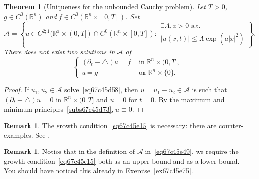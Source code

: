 \documentclass[a4paper,9pt]{amsart}
\newcommand{\scr}[1]{\mathscr{#1}}
\newcommand{\R}{\mathbb{R}}	%
\newcommand{\de}{\partial}		%
\newcommand{\laplacian}{\triangle}
\theoremstyle{plain}
\newtheorem{theorem}[proposition]{Theorem}
\theoremstyle{definition}
\newtheorem{remark}[proposition]{Remark}
\theoremstyle{remark}
\begin{document}
\begin{theorem}[Uniqueness for the unbounded Cauchy problem]\label{thm67c45cb9}
	Let $T>0$, $g\in C^0(\R^n)$ and $f\in C^0(\R^n\times[0,T])$.
	Set 
	\begin{equation}\label{eq67c45e49}
		\scr A = \left\{
		u\in C^{2;1}(\R^n\times(0,T])\cap C^0(\R^n\times[0,T]) : 
		\begin{array}{c}
		\exists A,a>0 \text{ s.t.}\\
		|u(x,t)| \le A\exp(a|x|^2)
		\end{array}
		\right\} .
	\end{equation}
	There does not exist two solutions in $\scr A$ of
	\begin{equation}\label{eq67c45d58}
	\begin{cases}
		(\de_t-\laplacian)u = f & \text{ in }\R^n\times(0,T] , \\
		u = g & \text{ on }\R^n\times\{0\} .
	\end{cases}
	\end{equation}
\end{theorem}
\begin{proof}
	If $u_1,u_2\in\scr A$ solve~\eqref{eq67c45d58}, then $u=u_1-u_2\in\scr A$
	is such that $(\de_t-\laplacian)u = 0$ in $\R^n\times(0,T]$ and
	$u=0$ for $t=0$.
	By the maximum and minimum principles~\ref{subs67c45d73},
	$u\equiv 0$.
\end{proof}
\begin{remark}
	The growth condition~\eqref{eq67c45e15} is necessary: there are counter-examples.
	See \cite[chapter 7]{zbMATH03739988}.
\end{remark}
\begin{remark}
	Notice that in the definition of $\scr A$ in~\eqref{eq67c45e49}, 
	we require the growth condition~\eqref{eq67c45e15} both as an upper bound and as a lower bound.
	You should have noticed this already in Exercise~\ref{ex67c45e75}.
\end{remark}

\end{document}
